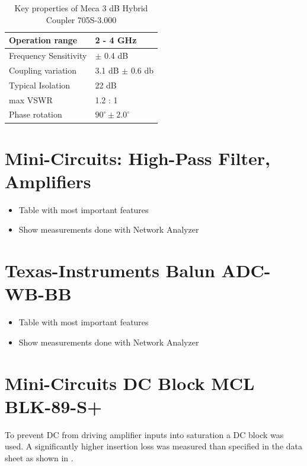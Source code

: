 \begin{table}[h]
  \centering
  \begin{tabular}{|l|l|}
    \hline
    Operation range & 2 - 4 GHz \\ \hline
    Frequency Sensitivity & $\pm$ 0.4 dB \\ \hline
    Coupling variation & 3.1 dB $\pm$ 0.6 db \\ \hline
    Typical Isolation & 22 dB \\ \hline
    max \gls{VSWR} & 1.2 : 1 \\ \hline
    Phase rotation & $90^\circ \pm 2.0^\circ$ \\ \hline
  \end{tabular}
  \caption{Key properties of Meca 3 dB Hybrid Coupler 705S-3.000}
  \label{tab:awg}
\end{table}


\section{Mini-Circuits: High-Pass Filter, Amplifiers}
\begin{itemize}
\item Table with most important features
\item Show measurements done with Network Analyzer
\end{itemize}

\section{Texas-Instruments Balun ADC-WB-BB}
\begin{itemize}
\item Table with most important features
\item Show measurements done with Network Analyzer
\end{itemize}

\section{Mini-Circuits DC Block MCL BLK-89-S+}
\label{sec:comp_dc_block}
To prevent \acrshort{DC} from driving amplifier inputs into saturation
a \acrshort{DC} block was used. A significantly higher insertion loss was
measured than specified in the data sheet as shown in
.

